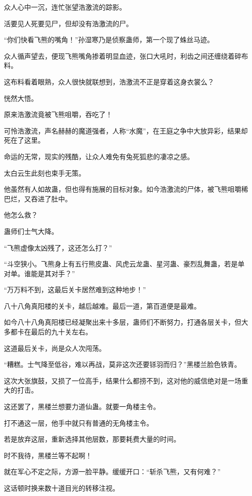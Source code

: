 \begin{this_body}
众人心中一沉，连忙张望浩激流的踪影。

活要见人死要见尸，但却没有浩激流的尸。

“你们快看飞熊的嘴角！”孙湿寒乃是侦察蛊师，第一个现了蛛丝马迹。

众人循声望去，便现飞熊嘴角掺着明显血迹，张口大吼时，利齿之间还缠绕着碎布料。

这布料看着眼熟，众人很快就联想到，浩激流不正是穿着这身衣裳么？

恍然大悟。

原来浩激流竟被飞熊咀嚼，吞吃了！

可怜浩激流，声名赫赫的魔道强者，人称“水魔”，在王庭之争中大放异彩，结果却死在了这里。

命运的无常，现实的残酷，让众人难免有兔死狐悲的凄凉之感。

太白云生此刻也束手无策。

他虽然有人如故蛊，但也得有施展的目标对象。如今浩激流的尸体，被飞熊咀嚼稀巴烂，又吞进了肚中。

他怎么救？

蛊师们士气大降。

“飞熊虚像太凶残了，这还怎么打？”

“斗空狭小。飞熊身上有五行熊皮蛊、风虎云龙蛊、星河蛊、豪烈乱舞蛊，若是单对单。谁能是其对手？”

“万万料不到，这最后关卡居然难到这种地步！”

八十八角真阳楼的关卡，越后越难。最后一道，第百道便是最难。

如今八十八角真阳楼已经凝聚出来十多层，蛊师们不断努力，打通各层关卡，但大多都卡在最后的九十关左右。

这道最后关卡，尚是众人次闯荡。

“糟糕。士气降至低谷，难以再战，莫非这次还要铩羽而归？”黑楼兰脸色铁青。

这次大张旗鼓，又损了一位高手，结果什么都捞不到，这对他的威信绝对是一场重大的打击。

这还罢了，黑楼兰想要力道仙蛊。就要一角楼主令。

打不通这一层，他手中就只有普通的无角楼主令。

若是放弃这层，重新选择其他层数，那要耗费大量的时间。

时不我待，黑楼兰等不起啊！

就在军心不定之际，方源一脸平静。缓缓开口：“斩杀飞熊，又有何难？”

这话顿时换来数十道目光的转移注视。


\end{this_body}
